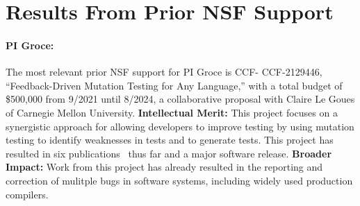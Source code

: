 \section{Results From Prior NSF Support}

\paragraph{PI Groce:}
The most relevant prior NSF support for PI Groce is CCF-
CCF-2129446, ``Feedback-Driven Mutation Testing for Any Language,'' with a total budget of \$500,000 from 9/2021 until 8/2024,
a collaborative proposal with Claire Le Goues of Carnegie Mellon
University. {\bf Intellectual Merit:} This project
focuses on a synergistic approach for allowing developers
to improve testing by using mutation testing to identify
weaknesses in tests and to generate tests.  This project has resulted in six
publications~\cite{cc2022,seip2022,fuzzing22,MindGap,ContextPMT,FSE24UM}
thus far and a major software release. {\bf
  Broader
  Impact:}  Work from this project has already
resulted in the reporting and correction of mulitple bugs in software
systems, including widely used production compilers.

